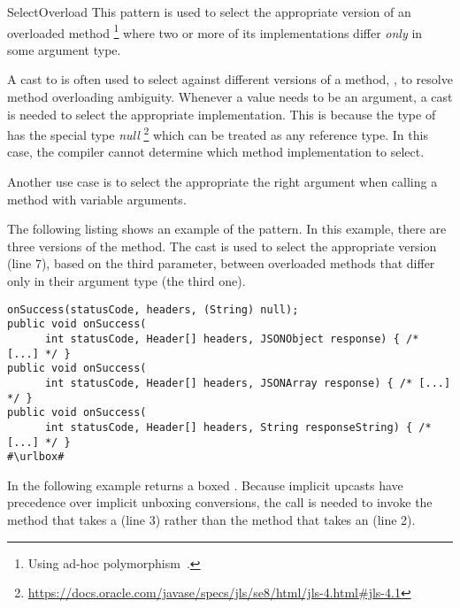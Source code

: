 \begin{pattern}{SelectOverload}
This pattern is used to select the appropriate version of an overloaded method%
\footnote{Using ad-hoc polymorphism~\citep{stracheyFundamentalConceptsProgramming2000}.}
where two or more of its implementations differ \emph{only} in some argument type.

A cast to  is often used to select against different versions of a method,
\ie{}, to resolve method overloading ambiguity.
Whenever a  value needs to be an argument,
a cast is needed to select the appropriate implementation.
This is because the type of  has the special type \emph{null}%
\footnote{\url{https://docs.oracle.com/javase/specs/jls/se8/html/jls-4.html\#jls-4.1}}
which can be treated as any reference type.
In this case,
the compiler cannot determine which method implementation to select.

Another use case is to select the appropriate the right argument when calling a method with variable arguments.

\instances{}
The following listing shows an example of the \thisp{} pattern.
In this example, there are three versions of the  method.
The cast  is used to select the appropriate version
(line 7), based on the third parameter,
between overloaded methods that differ only in their argument type (the third one).

\def\urlvar{http://bit.ly/loopj_android_async_http_2FENovD}
\begin{verbatim}
onSuccess(statusCode, headers, (String) null);
public void onSuccess(
      int statusCode, Header[] headers, JSONObject response) { /* [...] */ }
public void onSuccess(
      int statusCode, Header[] headers, JSONArray response) { /* [...] */ }
public void onSuccess(
      int statusCode, Header[] headers, String responseString) { /* [...] */ }
#\urlbox#
\end{verbatim}

In the following example  returns a boxed .
Because implicit upcasts have precedence over implicit unboxing conversions,
the call is needed to invoke the method that takes a  (line 3) rather than the method that takes an  (line 2).


\end{pattern}
